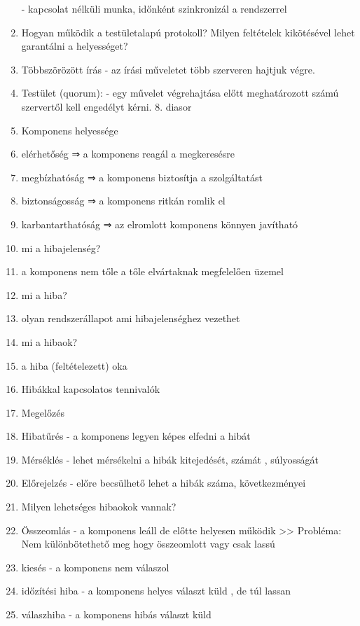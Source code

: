 \documentclass[twoside, a4paper, 12pt]{article}
\begin{document}
\begin{enumerate}
        - kapcsolat nélküli munka, időnként szinkronizál a rendszerrel	
    \item  Hogyan működik a testületalapú protokoll? Milyen feltételek kikötésével lehet garantálni a helyességet?
    \item Többszörözött írás
        - az írási műveletet több szerveren hajtjuk végre.
    \item Testület (quorum): 
        - egy művelet végrehajtása előtt meghatározott számú szervertől kell engedélyt kérni.
        8. diasor
    \item  Komponens helyessége
    \item elérhetőség       ⇒ a komponens reagál a megkeresésre
    \item megbízhatóság     ⇒ a komponens biztosítja a szolgáltatást
    \item biztonságosság    ⇒ a komponens ritkán romlik el
    \item karbantarthatóság ⇒ az elromlott komponens könnyen javítható
    \item  mi a hibajelenség?
    \item a komponens nem tőle a tőle elvártaknak megfelelően üzemel
    \item  mi a hiba?
    \item olyan rendszerállapot ami hibajelenséghez vezethet
    \item  mi a hibaok?
    \item a hiba (feltételezett) oka
    \item  Hibákkal kapcsolatos tennivalók
    \item Megelőzés
    \item Hibatűrés
        - a komponens legyen képes elfedni a hibát
    \item Mérséklés
        - lehet mérsékelni a hibák kitejedését, számát , súlyosságát
    \item Előrejelzés
        - előre becsülhető lehet a hibák száma, következményei
    \item  Milyen lehetséges hibaokok vannak?
    \item Összeomlás
        - a komponens leáll de előtte helyesen működik
        >> Probléma: Nem különbötethető meg hogy összeomlott vagy csak lassú 
    \item kiesés
        - a komponens nem válaszol
    \item időzítési hiba
        - a komponens helyes választ küld , de túl lassan
    \item válaszhiba
        - a komponens hibás választ küld

\end{enumerate}
\end{document}
